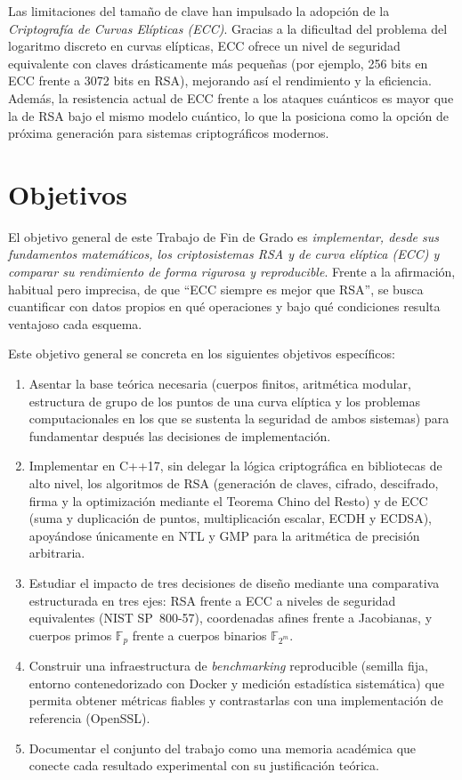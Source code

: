 Las limitaciones del tamaño de clave han impulsado la adopción de la \emph{Criptografía de Curvas Elípticas (ECC)}. Gracias a la dificultad del problema del logaritmo discreto en curvas elípticas, ECC ofrece un nivel de seguridad equivalente con claves drásticamente más pequeñas (por ejemplo, 256 bits en ECC frente a 3072 bits en RSA), mejorando así el rendimiento y la eficiencia. Además, la resistencia actual de ECC frente a los ataques cuánticos es mayor que la de RSA bajo el mismo modelo cuántico, lo que la posiciona como la opción de próxima generación para sistemas criptográficos modernos.

\section{Objetivos}
El objetivo general de este Trabajo de Fin de Grado es \emph{implementar, desde sus fundamentos matemáticos, los criptosistemas RSA y de curva elíptica (ECC) y 
comparar su rendimiento de forma rigurosa y reproducible}. Frente a la afirmación, habitual pero imprecisa, de que ``ECC siempre es mejor que RSA'', se busca cuantificar 
con datos propios en qué operaciones y bajo qué condiciones resulta ventajoso cada esquema.

Este objetivo general se concreta en los siguientes objetivos específicos:
\begin{enumerate}
  \item Asentar la base teórica necesaria (cuerpos finitos, aritmética modular, estructura de grupo de los puntos de una curva elíptica y los problemas computacionales en los que se sustenta la seguridad de ambos sistemas) para fundamentar después las decisiones de implementación.
  \item Implementar en C++17, sin delegar la lógica criptográfica en bibliotecas de alto nivel, los algoritmos de RSA (generación de claves, cifrado, descifrado, firma y la optimización mediante el Teorema Chino del Resto) y de ECC (suma y duplicación de puntos, multiplicación escalar, ECDH y ECDSA), apoyándose únicamente en NTL y GMP para la aritmética de precisión arbitraria.
  \item Estudiar el impacto de tres decisiones de diseño mediante una comparativa estructurada en tres ejes: RSA frente a ECC a niveles de seguridad equivalentes (NIST SP~800-57), coordenadas afines frente a Jacobianas, y cuerpos primos $\mathbb{F}_p$ frente a cuerpos binarios $\mathbb{F}_{2^m}$.
  \item Construir una infraestructura de \textit{benchmarking} reproducible (semilla fija, entorno contenedorizado con Docker y medición estadística sistemática) que permita obtener métricas fiables y contrastarlas con una implementación de referencia (OpenSSL).
  \item Documentar el conjunto del trabajo como una memoria académica que conecte cada resultado experimental con su justificación teórica.
\end{enumerate}

